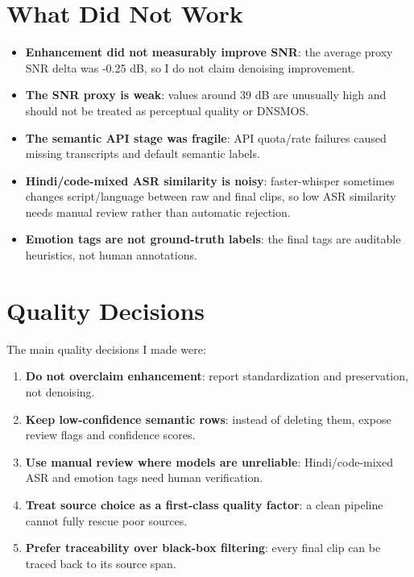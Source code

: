 \documentclass[11pt]{article}
\begin{document}
\section{What Did Not Work}

\begin{itemize}
    \item \textbf{Enhancement did not measurably improve SNR}: the average proxy SNR delta was -0.25 dB, so I do not claim denoising improvement.
    \item \textbf{The SNR proxy is weak}: values around 39 dB are unusually high and should not be treated as perceptual quality or DNSMOS.
    \item \textbf{The semantic API stage was fragile}: API quota/rate failures caused missing transcripts and default semantic labels.
    \item \textbf{Hindi/code-mixed ASR similarity is noisy}: faster-whisper sometimes changes script/language between raw and final clips, so low ASR similarity needs manual review rather than automatic rejection.
    \item \textbf{Emotion tags are not ground-truth labels}: the final tags are auditable heuristics, not human annotations.
\end{itemize}

\section{Quality Decisions}

The main quality decisions I made were:

\begin{enumerate}
    \item \textbf{Do not overclaim enhancement}: report standardization and preservation, not denoising.
    \item \textbf{Keep low-confidence semantic rows}: instead of deleting them, expose review flags and confidence scores.
    \item \textbf{Use manual review where models are unreliable}: Hindi/code-mixed ASR and emotion tags need human verification.
    \item \textbf{Treat source choice as a first-class quality factor}: a clean pipeline cannot fully rescue poor sources.
    \item \textbf{Prefer traceability over black-box filtering}: every final clip can be traced back to its source span.
\end{enumerate}
\end{document}
